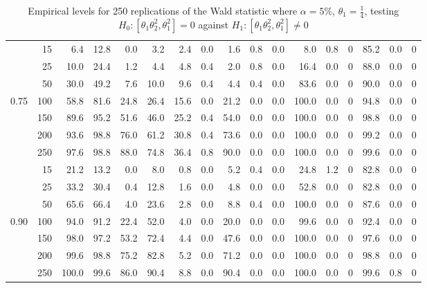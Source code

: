 \documentclass[11pt]{article}\usepackage[]{graphicx}\usepackage[]{color}
\begin{document}
\begin{table}[H]
{\begin{tabular}{|r|r|r|r|r|r|r|r|r|r|r|r|r|r|r|r|r|}
			\hline
			& 15 & 6.4 & 12.8 & 0.0 & 3.2 & 2.4 & 0.0 & 1.6 & 0.8 & 0.0 & 8.0 & 0.8 & 0 & 85.2 & 0.0 & 0 \\
			& 25 & 10.0 & 24.4 & 1.2 & 4.4 & 4.8 & 0.4 & 2.0 & 0.8 & 0.0 & 16.4 & 0.0 & 0 & 88.0 & 0.0 & 0 \\
			& 50 & 30.0 & 49.2 & 7.6 & 10.0 & 9.6 & 0.4 & 4.4 & 0.4 & 0.0 & 83.6 & 0.0 & 0 & 90.0 & 0.0 & 0 \\
			0.75 & 100 & 58.8 & 81.6 & 24.8 & 26.4 & 15.6 & 0.0 & 21.2 & 0.0 & 0.0 & 100.0 & 0.0 & 0 & 94.8 & 0.0 & 0 \\
			& 150 & 89.6 & 95.2 & 51.6 & 46.0 & 25.2 & 0.4 & 54.0 & 0.0 & 0.0 & 100.0 & 0.0 & 0 & 98.8 & 0.0 & 0 \\
			& 200 & 93.6 & 98.8 & 76.0 & 61.2 & 30.8 & 0.4 & 73.6 & 0.0 & 0.0 & 100.0 & 0.0 & 0 & 99.2 & 0.0 & 0 \\
			& 250 & 97.6 & 98.8 & 88.0 & 74.8 & 36.4 & 0.8 & 90.0 & 0.0 & 0.0 & 100.0 & 0.0 & 0 & 99.6 & 0.0 & 0 \\
			\hline
			& 15 & 21.2 & 13.2 & 0.0 & 8.0 & 0.8 & 0.0 & 5.2 & 0.4 & 0.0 & 24.8 & 1.2 & 0 & 82.8 & 0.0 & 0 \\
			& 25 & 33.2 & 30.4 & 0.4 & 12.8 & 1.6 & 0.0 & 4.8 & 0.0 & 0.0 & 52.8 & 0.0 & 0 & 82.8 & 0.0 & 0 \\
			& 50 & 65.6 & 66.4 & 4.0 & 23.6 & 2.8 & 0.0 & 8.8 & 0.4 & 0.0 & 100.0 & 0.0 & 0 & 87.6 & 0.0 & 0 \\
			0.90 & 100 & 94.0 & 91.2 & 22.4 & 52.0 & 4.0 & 0.0 & 20.0 & 0.0 & 0.0 & 99.6 & 0.0 & 0 & 92.4 & 0.0 & 0 \\
			& 150 & 98.0 & 97.2 & 53.2 & 72.4 & 4.4 & 0.0 & 47.6 & 0.0 & 0.0 & 100.0 & 0.0 & 0 & 97.6 & 0.0 & 0 \\
			& 200 & 99.6 & 98.8 & 75.2 & 82.8 & 5.2 & 0.0 & 71.2 & 0.0 & 0.0 & 100.0 & 0.0 & 0 & 98.8 & 0.0 & 0 \\
			& 250 & 100.0 & 99.6 & 86.0 & 90.4 & 8.8 & 0.0 & 90.4 & 0.0 & 0.0 & 100.0 & 0.0 & 0 & 99.6 & 0.8 & 0 \\
			\hline
		\end{tabular}
	}
	\caption{Empirical levels for 250 replications of the Wald statistic where $\alpha = 5\%$, $\theta_1=\frac{1}{4}$, testing $H_0: \left[ \theta_1\theta_2^2, \theta_1^2\right] =0$ against $H_1: \left[ \theta_1\theta_2^2, \theta_1^2\right] \neq 0$}
	\label{tbl:W:14}
\end{table}
\end{document}
